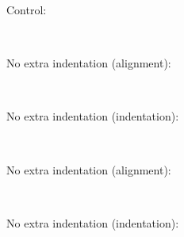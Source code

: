 \documentclass{article}
\begin{document}
\noindent Control:
\begin{code}%
%
\>[2]\AgdaFunction{\AgdaUnderscore{}}\AgdaSpace{}%
\AgdaSymbol{:}\AgdaSpace{}%
\<%
\\
%
\>[2]\AgdaSymbol{\AgdaUnderscore{}}\AgdaSpace{}%
\AgdaSymbol{=}\AgdaSpace{}%
\<%
\end{code}

\noindent No extra indentation (alignment):
\begin{code}[hide]%
%
\>[2]\AgdaFunction{\AgdaUnderscore{}}\AgdaSpace{}%
\AgdaSymbol{:}\AgdaSpace{}%
\<%
\\
%
\>[2]\AgdaSymbol{\AgdaUnderscore{}}%
\>[6I]\AgdaSymbol{=}\<%
\end{code}
\begin{code}%
\>[.][@{}l@{}]\<[6I]%
\>[4]\<%
\end{code}

\noindent No extra indentation (indentation):
\begin{code}[hide]%
%
\>[2]\AgdaFunction{\AgdaUnderscore{}}\AgdaSpace{}%
\AgdaSymbol{:}\AgdaSpace{}%
\<%
\\
%
\>[2]\AgdaSymbol{\AgdaUnderscore{}}%
\>[9I]\AgdaSymbol{=}\<%
\end{code}
\begin{code}%
\>[9I][@{}l@{\AgdaIndent{1}}]%
\>[5]\<%
\end{code}

\noindent No extra indentation (alignment):
\begin{code}[hide]%
%
\>[2]\<%
\\
\>[2][@{}l@{\AgdaIndent{0}}]%
\>[4]\AgdaPostulate{\AgdaUnderscore{}}%
\>[10I]\AgdaSymbol{:}\<%
\end{code}
\begin{code}%
\>[.][@{}l@{}]\<[10I]%
\>[6]\<%
\end{code}

\noindent No extra indentation (indentation):
\begin{code}[hide]%
%
\>[2]\<%
\\
\>[2][@{}l@{\AgdaIndent{0}}]%
\>[4]\AgdaPostulate{\AgdaUnderscore{}}%
\>[11I]\AgdaSymbol{:}\<%
\end{code}
\begin{code}%
\>[11I][@{}l@{\AgdaIndent{1}}]%
\>[7]\<%
\end{code}
\end{document}
